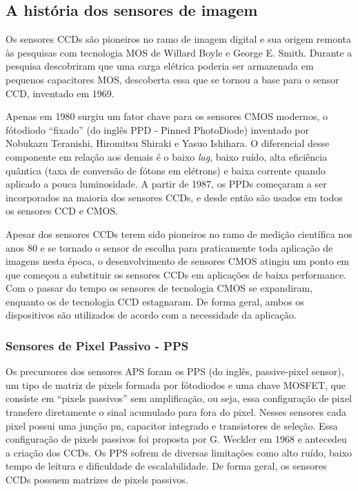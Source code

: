 \documentclass[10pt,a4paper,twocolumn]{article}
\begin{document}
	\subsection*{A história dos sensores de imagem}
		Os sensores CCDs são pioneiros no ramo de imagem digital e sua origem remonta às pesquisas com tecnologia MOS de Willard Boyle e George E. Smith. Durante a pesquisa descobriram que uma carga elétrica poderia ser armazenada em pequenos capacitores MOS, descoberta essa que se tornou a base para o sensor CCD, inventado em 1969.
		
		Apenas em 1980 surgiu um fator chave para os sensores CMOS modernos, o fótodiodo ``fixado'' (do inglês PPD - Pinned PhotoDiode) inventado por Nobukazu Teranishi, Hiromitsu Shiraki e Yasuo Ishihara. O diferencial desse componente em relação aos demais é o baixo \textit{lag}, baixo ruído, alta eficiência quântica (taxa de conversão de fótons em elétrons) e baixa corrente quando aplicado a pouca luminosidade. A partir de 1987, os PPDs começaram a ser incorporados na maioria dos sensores CCDs, e desde então são usados em todos os sensores CCD e CMOS.
	
		Apesar dos sensores CCDs terem sido pioneiros no ramo de medição científica nos anos 80 e se tornado o sensor de escolha para praticamente toda aplicação de imagens nesta época, o desenvolvimento de sensores CMOS atingiu um ponto em que começou a substituir os sensores CCDs em aplicações de baixa performance. Com o passar do tempo os sensores de tecnologia CMOS se expandiram, enquanto os de tecnologia CCD estagnaram. De forma geral, ambos os dispositivos são utilizados de acordo com a necessidade da aplicação.
		
	\subsubsection*{Sensores de Pixel Passivo - PPS} 
		Os precursores dos sensores APS foram os PPS (do inglês, passive-pixel sensor), um tipo de matriz de pixels formada por fótodiodos e uma chave MOSFET, que consiste em ``pixels passivos'' sem amplificação, ou seja, essa configuração de pixel transfere diretamente o sinal acumulado para fora do pixel. Nesses sensores cada pixel possui uma junção pn, capacitor integrado e transistores de seleção. Essa configuração de pixels passivos foi proposta por G. Weckler em 1968 e antecedeu a criação dos CCDs. Os PPS sofrem de diversas limitações como alto ruído, baixo tempo de leitura e dificuldade de escalabilidade. De forma geral, os sensores CCDs possuem matrizes de pixels passivos.
		
\end{document}
